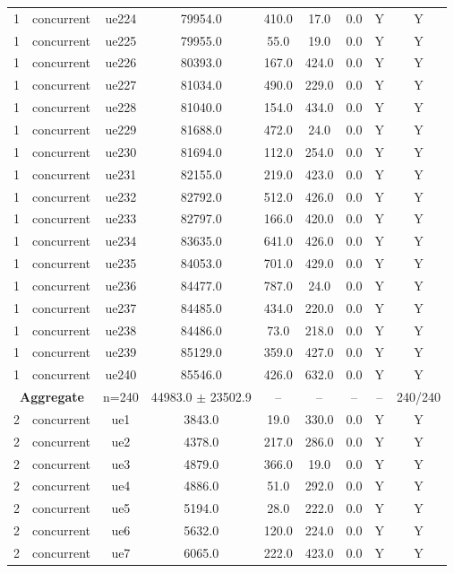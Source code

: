 \begin{table}[ht]
\begin{tabular}{|c|c|c|c|c|c|c|c|c|}
1 & concurrent & ue224 & 79954.0 & 410.0 & 17.0 & 0.0 & Y & Y \\
1 & concurrent & ue225 & 79955.0 & 55.0 & 19.0 & 0.0 & Y & Y \\
1 & concurrent & ue226 & 80393.0 & 167.0 & 424.0 & 0.0 & Y & Y \\
1 & concurrent & ue227 & 81034.0 & 490.0 & 229.0 & 0.0 & Y & Y \\
1 & concurrent & ue228 & 81040.0 & 154.0 & 434.0 & 0.0 & Y & Y \\
1 & concurrent & ue229 & 81688.0 & 472.0 & 24.0 & 0.0 & Y & Y \\
1 & concurrent & ue230 & 81694.0 & 112.0 & 254.0 & 0.0 & Y & Y \\
1 & concurrent & ue231 & 82155.0 & 219.0 & 423.0 & 0.0 & Y & Y \\
1 & concurrent & ue232 & 82792.0 & 512.0 & 426.0 & 0.0 & Y & Y \\
1 & concurrent & ue233 & 82797.0 & 166.0 & 420.0 & 0.0 & Y & Y \\
1 & concurrent & ue234 & 83635.0 & 641.0 & 426.0 & 0.0 & Y & Y \\
1 & concurrent & ue235 & 84053.0 & 701.0 & 429.0 & 0.0 & Y & Y \\
1 & concurrent & ue236 & 84477.0 & 787.0 & 24.0 & 0.0 & Y & Y \\
1 & concurrent & ue237 & 84485.0 & 434.0 & 220.0 & 0.0 & Y & Y \\
1 & concurrent & ue238 & 84486.0 & 73.0 & 218.0 & 0.0 & Y & Y \\
1 & concurrent & ue239 & 85129.0 & 359.0 & 427.0 & 0.0 & Y & Y \\
1 & concurrent & ue240 & 85546.0 & 426.0 & 632.0 & 0.0 & Y & Y \\
\multicolumn{2}{|c|}{\textbf{Aggregate}} & n=240 & 44983.0 $\pm$ 23502.9 & -- & -- & -- & -- & 240/240 \\
\hline
2 & concurrent & ue1 & 3843.0 & 19.0 & 330.0 & 0.0 & Y & Y \\
2 & concurrent & ue2 & 4378.0 & 217.0 & 286.0 & 0.0 & Y & Y \\
2 & concurrent & ue3 & 4879.0 & 366.0 & 19.0 & 0.0 & Y & Y \\
2 & concurrent & ue4 & 4886.0 & 51.0 & 292.0 & 0.0 & Y & Y \\
2 & concurrent & ue5 & 5194.0 & 28.0 & 222.0 & 0.0 & Y & Y \\
2 & concurrent & ue6 & 5632.0 & 120.0 & 224.0 & 0.0 & Y & Y \\
2 & concurrent & ue7 & 6065.0 & 222.0 & 423.0 & 0.0 & Y & Y \\

\end{tabular}
\end{table}
